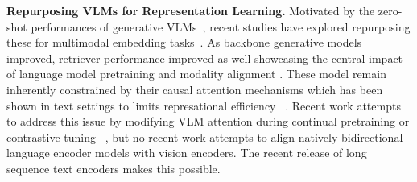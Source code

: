 \noindent\textbf{Repurposing VLMs for Representation Learning.}  
Motivated by the zero-shot performances of generative VLMs~\citep{alayrac2022flamingovisuallanguagemodel, lucas_beyer_paligemma_2024, bai_qwen-vl_2023}, recent studies have explored repurposing these for multimodal embedding tasks~\citep{ma2024unifyingmultimodalretrievaldocument,faysse2025colpaliefficientdocumentretrieval,jiang2025vlm2vectrainingvisionlanguagemodels, zhang2025gmeimprovinguniversalmultimodal}. As backbone generative models improved, retriever performance improved as well showcasing the central impact of language model pretraining and modality alignment \citep{xu2025llamanemoretrievercolembedtopperforming, nussbaum2025nomicembedtrainingreproducible}. 
These model remain inherently constrained by their causal attention mechanisms which has been shown in text settings to limits represational efficiency ~\citep{gisserotboukhlef2025pretrainencodersmaskedlanguage,weller2025seqvsseqopen}. Recent work attempts to address this issue by modifying VLM attention during continual pretraining \citep{chen2025mocamodalityawarecontinualpretraining} or contrastive tuning ~\citep{jiang2025vlm2vectrainingvisionlanguagemodels, xu2025llamanemoretrievercolembedtopperforming}, but no recent work attempts to align natively bidirectional language encoder models with vision encoders. The recent release of long sequence text encoders \citep{modernbert, boizard2025eurobertscalingmultilingualencoders} makes this possible.

